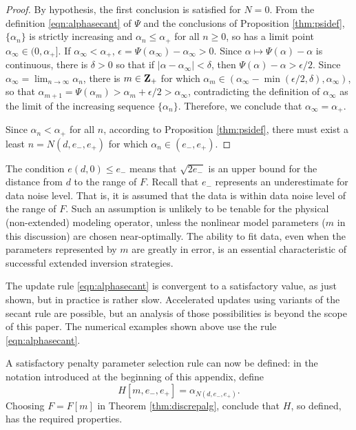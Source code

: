 \begin{proof}
  By hypothesis, the first conclusion is satisfied for $N=0$. From the definition \ref{eqn:alphasecant} of $\Psi$ and the conclusions of Proposition \ref{thm:psidef}, $\{\alpha_n\}$ is strictly increasing and $\alpha_n \le \alpha_+$ for all $n \ge 0$, so has a limit point $\alpha_{\infty} \in (0,\alpha_+]$. If $\alpha_{\infty}<\alpha_+$, $\epsilon = \Psi(\alpha_{\infty})-\alpha_{\infty} >0$. Since $\alpha \mapsto \Psi(\alpha)-\alpha$ is continuous, there is $\delta>0$ so that if $|\alpha-\alpha_{\infty}|<\delta$, then $\Psi(\alpha)-\alpha >\epsilon/2$. Since $\alpha_{\infty}=\lim_{n\rightarrow \infty}\alpha_n$, there is $m \in {\bf Z}_+$ for which $\alpha_m \in (\alpha_{\infty}-\min(\epsilon/2,\delta),\alpha_{\infty})$, so that $\alpha_{m+1} = \Psi(\alpha_m) >\alpha_m + \epsilon/2>\alpha_{\infty}$, contradicting the definition of $\alpha_{\infty}$ as the limit of the increasing sequence $\{\alpha_n\}$. Therefore, we conclude that $\alpha_{\infty}=\alpha_+$.
  
  Since $\alpha_n <\alpha_+$ for all $n$, according to Proposition \ref{thm:psidef}, there must exist a least $n = N(d,e_-,e_+)$ for which $\alpha_n \in (e_-,e_+)$.
\end{proof}

 The condition $e(d,0)\le e_-$ means that $\sqrt{2e_-}$ is an upper bound for the distance from $d$ to the range of $F$. Recall that $e_-$ represents an underestimate for data noise level. That is, it is assumed that the data is within data noise level of the range of $F$. Such an assumption is unlikely to be tenable for the physical (non-extended) modeling operator, unless the nonlinear model parameters ($m$ in this discussion) are chosen near-optimally. The ability to fit data, even when the parameters represented by $m$ are greatly in error, is an essential characteristic of successful extended inversion strategies. 

 The update rule \ref{eqn:alphasecant} is convergent to a satisfactory value, as just shown, but in practice is rather slow. Accelerated updates using variants of the secant rule are possible, but an analysis of those possibilities is beyond the scope of this paper. The numerical examples shown above use the rule \ref{eqn:alphasecant}.

A satisfactory penalty parameter selection rule can now be defined: in the notation introduced at the beginning of this appendix, define 
\begin{equation}
    H[m,e_-,e_+] = \alpha_{N(d,e_-,e_+)}.
\end{equation}
Choosing $F=F[m]$ in Theorem \ref{thm:discrepalg}, conclude that $H$, so defined, has the required properties.

